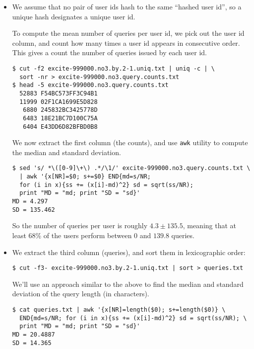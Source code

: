 \begin{itemize}

\item

We assume that no pair of user ids hash to the same ``hashed user id'',
so a unique hash designates a unique user id.

To compute the mean number of queries per user id, we pick out the user id
column, and count how many times a user id appears in consecutive order. This
gives a count the number of queries issued by each user id.

\begin{verbatim}
$ cut -f2 excite-999000.no3.by.2-1.uniq.txt | uniq -c | \
  sort -nr > excite-999000.no3.query.counts.txt
$ head -5 excite-999000.no3.query.counts.txt 
  52883 F54BC573FF3C94B1
  11999 02F1CA1699E5D828
   6880 245832BC3425778D
   6483 18E21BC7D100C75A
   6404 E43DD6D82BFBD0B8
\end{verbatim}

We now extract the first column (the counts), and use \texttt{awk} utility to
compute the median and standard deviation.

\begin{verbatim}
$ sed 's/ *\([0-9]\+\) .*/\1/' excite-999000.no3.query.counts.txt \
  | awk '{x[NR]=$0; s+=$0} END{md=s/NR;
  for (i in x){ss += (x[i]-md)^2} sd = sqrt(ss/NR);
  print "MD = "md; print "SD = "sd}'
MD = 4.297
SD = 135.462
\end{verbatim}

So the number of queries per user is roughly $4.3\pm135.5$, meaning that at
least 68\% of the users perform between $0$ and $139.8$ queries.

\item

We extract the third column (queries), and sort them in lexicographic order:

\begin{verbatim}
$ cut -f3- excite-999000.no3.by.2-1.uniq.txt | sort > queries.txt
\end{verbatim}

We'll use an approach similar to the above to find the median and standard
deviation of the query length (in characters).

\begin{verbatim}
$ cat queries.txt | awk '{x[NR]=length($0); s+=length($0)} \
  END{md=s/NR; for (i in x){ss += (x[i]-md)^2} sd = sqrt(ss/NR); \
  print "MD = "md; print "SD = "sd}'
MD = 20.4887
SD = 14.365
\end{verbatim}


\end{itemize}
